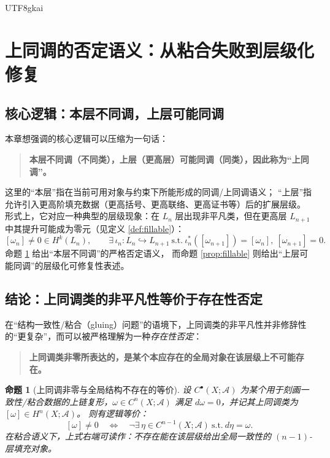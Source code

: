 \documentclass[12pt]{article}
\newtheorem{proposition}{命题}[section]
\begin{document}
\begin{CJK*}{UTF8}{gkai}
\section{上同调的否定语义：从粘合失败到层级化修复}

\subsection{核心逻辑：本层不同调，上层可能同调}

本章想强调的核心逻辑可以压缩为一句话：
\begin{quote}
\textbf{本层不同调（不同类），上层（更高层）可能同调（同类），因此称为“上同调”。}
\end{quote}

这里的“本层”指在当前可用对象与约束下所能形成的同调/上同调语义；
“上层”指允许引入更高阶填充数据（更高括号、更高联络、更高证书等）后的扩展层级。
形式上，它对应一种典型的层级现象：在 $L_n$ 层出现非平凡类，但在更高层 $L_{n+1}$ 中其提升可能成为零元（见定义 \ref{def:fillable}）：
\[
  [\omega_n]\neq 0\in H^k(L_n),
  \qquad
  \exists\,\iota_n\colon L_n\hookrightarrow L_{n+1}\ \text{s.t.}\
  \iota_n^\ast([\omega_{n+1}])=[\omega_n],\
  [\omega_{n+1}]=0.
\]
命题 \ref{prop:cohomology-not} 给出“本层不同调”的严格否定语义，
而命题 \ref{prop:fillable} 则给出“上层可能同调”的层级化可修复性表述。

\subsection{结论：上同调类的非平凡性等价于存在性否定}

在“结构一致性/粘合（gluing）问题”的语境下，上同调类的非平凡性并非修辞性的“更复杂”，而可以被严格理解为一种\emph{存在性否定}：
\begin{quote}
\textbf{上同调类非零所表达的，是某个本应存在的全局对象在该层级上不可能存在。}
\end{quote}

\begin{proposition}[上同调非零与全局结构不存在的等价]\label{prop:cohomology-not}
设 $C^\bullet(X;\mathcal{A})$ 为某个用于刻画一致性/粘合数据的上链复形，$\omega\in C^n(X;\mathcal{A})$ 满足 $d\omega=0$，并记其上同调类为 $[\omega]\in
  H^n(X;\mathcal{A})$。
则有逻辑等价：
\[
  [\omega]\neq 0
  \quad\Longleftrightarrow\quad
  \neg\exists\,\eta\in C^{n-1}(X;\mathcal{A})\ \text{s.t.}\ d\eta=\omega .
\]
在粘合语义下，上式右端可读作：\emph{不存在能在该层级给出全局一致性的 $(n-1)$-层填充对象}。
\end{proposition}


\end{CJK*}
\end{document}
